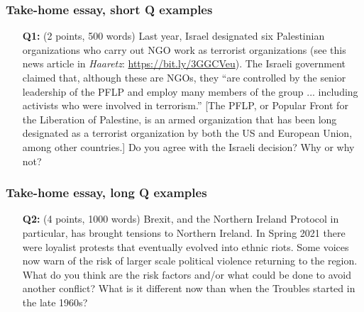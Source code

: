 \documentclass[aspectratio=43]{beamer}
\begin{document}
\begin{frame}
\frametitle{Take-home essay, short Q examples}
\centering

\begin{itemize}
  \item[\textbf{Q1:}] (2 points, 500 words) Last year, Israel designated six Palestinian organizations who carry out NGO work as terrorist organizations (see this news article in \textit{Haaretz}: \url{https://bit.ly/3GGCVeu}). The Israeli government claimed that, although these are NGOs, they ``are controlled by the senior leadership of the PFLP and employ many members of the group ... including activists who were involved in terrorism.'' [The PFLP, or Popular Front for the Liberation of Palestine, is an armed organization that has been long designated as a terrorist organization by both the US and European Union, among other countries.] Do you agree with the Israeli decision? Why or why not?
\end{itemize}

\end{frame}

\begin{frame}
\frametitle{Take-home essay, long Q examples}
\centering

\begin{itemize}
  \item[\textbf{Q2:}] (4 points, 1000 words) Brexit, and the Northern Ireland Protocol in particular, has brought tensions to Northern Ireland. In Spring 2021 there were loyalist protests that eventually evolved into ethnic riots. Some voices now warn of the risk of larger scale political violence returning to the region. What do you think are the risk factors and/or what could be done to avoid another conflict? What is it different now than when the Troubles started in the late 1960s?
\end{itemize}

\end{frame}
\end{document}
